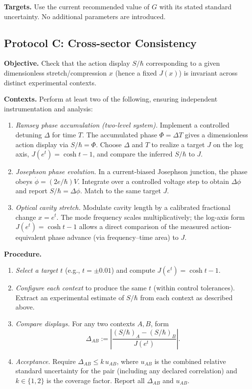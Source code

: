 \documentclass[11pt]{article}
\theoremstyle{plain}
\theoremstyle{definition}
\theoremstyle{remark}
\begin{document}
\textbf{Targets.} Use the current recommended value of \(G\) with its stated standard uncertainty. No additional parameters are introduced.

\medskip

\subsection*{Protocol C: Cross-sector Consistency}
\textbf{Objective.} Check that the action display \(S/\hbar\) corresponding to a given dimensionless stretch/compression \(x\) (hence a fixed \(J(x)\)) is invariant across distinct experimental contexts.

\textbf{Contexts.} Perform at least two of the following, ensuring independent instrumentation and analysis:
\begin{enumerate}
  \item \emph{Ramsey phase accumulation (two-level system).} Implement a controlled detuning \(\Delta\) for time \(T\). The accumulated phase \(\Phi=\Delta T\) gives a dimensionless action display via \(S/\hbar=\Phi\). Choose \(\Delta\) and \(T\) to realize a target \(J\) on the log axis, \(J(e^{t})=\cosh t-1\), and compare the inferred \(S/\hbar\) to \(J\).
  \item \emph{Josephson phase evolution.} In a current-biased Josephson junction, the phase obeys \(\dot{\phi}=(2e/\hbar)V\). Integrate over a controlled voltage step to obtain \(\Delta\phi\) and report \(S/\hbar=\Delta\phi\). Match to the same target \(J\).
  \item \emph{Optical cavity stretch.} Modulate cavity length by a calibrated fractional change \(x=e^{t}\). The mode frequency scales multiplicatively; the log-axis form \(J(e^{t})=\cosh t-1\) allows a direct comparison of the measured action-equivalent phase advance (via frequency–time area) to \(J\).
\end{enumerate}

\textbf{Procedure.}
\begin{enumerate}
  \item \emph{Select a target \(t\)} (e.g., \(t=\pm 0.01\)) and compute \(J(e^{t})=\cosh t-1\).
  \item \emph{Configure each context} to produce the same \(t\) (within control tolerances). Extract an experimental estimate of \(S/\hbar\) from each context as described above.
  \item \emph{Compare displays.} For any two contexts \(A,B\), form
  \[
  \Delta_{AB}:=\left|\frac{(S/\hbar)_A-(S/\hbar)_B}{J(e^{t})}\right|.
  \]
  \item \emph{Acceptance.} Require \(\Delta_{AB}\le k\,u_{AB}\), where \(u_{AB}\) is the combined relative standard uncertainty for the pair (including any declared correlation) and \(k\in\{1,2\}\) is the coverage factor. Report all \(\Delta_{AB}\) and \(u_{AB}\).
\end{enumerate}
\end{document}
